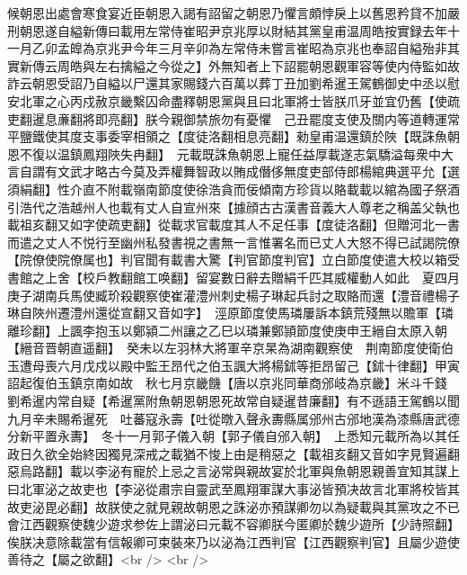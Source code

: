 候朝恩出處會寒食宴近臣朝恩入謁有詔留之朝恩乃懼言頗悖戾上以舊恩矜貸不加嚴刑朝恩遂自縊新傳曰載用左常侍崔昭尹京兆厚以財結其黨皇甫温周皓按實録去年十一月乙卯孟皥為京兆尹今年三月辛卯為左常侍未嘗言崔昭為京兆也奉詔自縊殆非其實新傳云周皓與左右擒縊之今從之】外無知者上下詔罷朝恩觀軍容等使内侍監如故詐云朝恩受詔乃自縊以尸還其家賜錢六百萬以葬丁丑加劉希暹王駕鶴御史中丞以慰安北軍之心丙戍赦京畿繫囚命盡釋朝恩黨與且曰北軍將士皆朕爪牙並宜仍舊【使疏吏翻暹息亷翻將即亮翻】朕今親御禁旅勿有憂懼　己丑罷度支使及關内等道轉運常平鹽鐵使其度支事委宰相領之【度徒洛翻相息亮翻】勑皇甫温還鎮於陜【既誅魚朝恩不復以温鎮鳳翔陜失冉翻】　元載既誅魚朝恩上寵任益厚載遂志氣驕溢每衆中大言自謂有文武才略古今莫及弄權舞智政以賄成僭侈無度吏部侍郎楊綰典選平允【選須絹翻】性介直不附載嶺南節度使徐浩貪而佞傾南方珍貨以賂載載以綰為國子祭酒引浩代之浩越州人也載有丈人自宣州來【據顔古古漢書音義大人尊老之稱盖父執也載祖亥翻又如字使疏吏翻】從載求官載度其人不足任事【度徒洛翻】但贈河北一書而遣之丈人不悦行至幽州私發書視之書無一言惟署名而已丈人大怒不得已試謁院僚【院僚使院僚属也】判官聞有載書大驚【判官節度判官】立白節度使遣大校以箱受書館之上舍【校戶教翻館工唤翻】留宴數日辭去贈絹千匹其威權動人如此　夏四月庚子湖南兵馬使臧玠殺觀察使崔灌澧州刺史楊子琳起兵討之取賂而還【澧音禮楊子琳自陜州遷澧州還從宣翻又音如字】　涇原節度使馬璘屢訴本鎮荒殘無以贍軍【璘離珍翻】上諷李抱玉以鄭潁二州讓之乙巳以璘兼鄭頴節度使庚申王縉自太原入朝【縉音晋朝直遥翻】　癸未以左羽林大將軍辛京杲為湖南觀察使　荆南節度使衛伯玉遭母喪六月戊戍以殿中監王昂代之伯玉諷大將楊鉥等拒昂留己【鉥十律翻】甲寅詔起復伯玉鎮京南如故　秋七月京畿饑【唐以京兆同華商邠岐為京畿】米斗千錢　劉希暹内常自疑【希暹黨附魚朝恩朝恩死故常自疑暹昔廉翻】有不遜語王駕鶴以聞九月辛未賜希暹死　吐蕃寇永壽【吐從暾入聲永夀縣属邠州古邠地漢為漆縣唐武德分新平置永夀】　冬十一月郭子儀入朝【郭子儀自邠入朝】　上悉知元載所為以其任政日久欲全始終因獨見深戒之載猶不悛上由是稍惡之【載祖亥翻又音如字見賢遍翻惡烏路翻】載以李泌有寵於上忌之言泌常與親故宴於北軍與魚朝恩親善宜知其謀上曰北軍泌之故吏也【李泌從肅宗自靈武至鳳翔軍謀大事泌皆預决故言北軍將校皆其故吏泌毘必翻】故朕使之就見親故朝恩之誅泌亦預謀卿勿以為疑載與其黨攻之不已會江西觀察使魏少遊求参佐上謂泌曰元載不容卿朕今匿卿於魏少遊所【少詩照翻】俟朕决意除載當有信報卿可束裝來乃以泌為江西判官【江西觀察判官】且屬少遊使善待之【屬之欲翻】<br />
<br />
